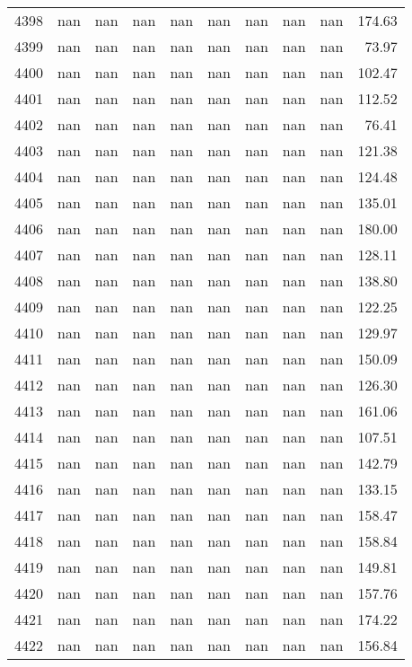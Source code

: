\begin{tabular}{lrrrrrrrrr}
4398 & nan & nan & nan & nan & nan & nan & nan & nan & 174.63 \\
4399 & nan & nan & nan & nan & nan & nan & nan & nan & 73.97 \\
4400 & nan & nan & nan & nan & nan & nan & nan & nan & 102.47 \\
4401 & nan & nan & nan & nan & nan & nan & nan & nan & 112.52 \\
4402 & nan & nan & nan & nan & nan & nan & nan & nan & 76.41 \\
4403 & nan & nan & nan & nan & nan & nan & nan & nan & 121.38 \\
4404 & nan & nan & nan & nan & nan & nan & nan & nan & 124.48 \\
4405 & nan & nan & nan & nan & nan & nan & nan & nan & 135.01 \\
4406 & nan & nan & nan & nan & nan & nan & nan & nan & 180.00 \\
4407 & nan & nan & nan & nan & nan & nan & nan & nan & 128.11 \\
4408 & nan & nan & nan & nan & nan & nan & nan & nan & 138.80 \\
4409 & nan & nan & nan & nan & nan & nan & nan & nan & 122.25 \\
4410 & nan & nan & nan & nan & nan & nan & nan & nan & 129.97 \\
4411 & nan & nan & nan & nan & nan & nan & nan & nan & 150.09 \\
4412 & nan & nan & nan & nan & nan & nan & nan & nan & 126.30 \\
4413 & nan & nan & nan & nan & nan & nan & nan & nan & 161.06 \\
4414 & nan & nan & nan & nan & nan & nan & nan & nan & 107.51 \\
4415 & nan & nan & nan & nan & nan & nan & nan & nan & 142.79 \\
4416 & nan & nan & nan & nan & nan & nan & nan & nan & 133.15 \\
4417 & nan & nan & nan & nan & nan & nan & nan & nan & 158.47 \\
4418 & nan & nan & nan & nan & nan & nan & nan & nan & 158.84 \\
4419 & nan & nan & nan & nan & nan & nan & nan & nan & 149.81 \\
4420 & nan & nan & nan & nan & nan & nan & nan & nan & 157.76 \\
4421 & nan & nan & nan & nan & nan & nan & nan & nan & 174.22 \\
4422 & nan & nan & nan & nan & nan & nan & nan & nan & 156.84 \\

\end{tabular}
